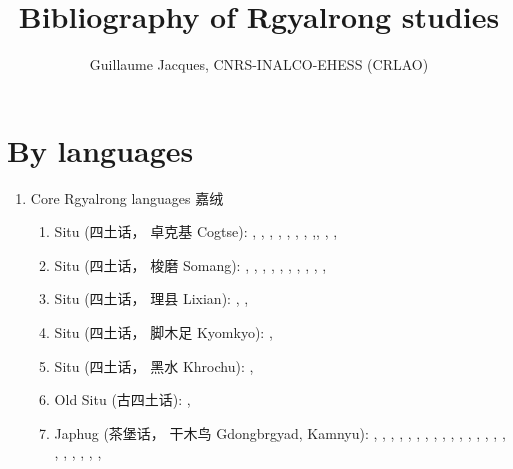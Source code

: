 \documentclass[oldfontcommands,oneside,a4paper,11pt]{article}
\newcommand{\zh}[1]{{\cn #1}}
\newcommand{\langue}[2]{#1}
\begin{document}
  \title{\langue{Bibliography of Rgyalrong studies}{Bibliographie des études rgyalrong}}
 
\author{Guillaume Jacques, CNRS-INALCO-EHESS (CRLAO)}
\maketitle
\sloppy
 
 
\section{\langue{By languages}{Publications classées par langue étudiée}}
\begin{enumerate}
\item \langue{Core Rgyalrong languages \zh{嘉绒}}{Rgyalrong \zh{嘉绒}}
\begin{enumerate}
\item Situ (\zh{四土话， 卓克基} Cogtse): \citet{nagano84}, \citet{linxr93jiarong}, \citet{lin02dimension}, \citet{huangsun02}, \citet{youjing03zhuokeji}, \citet{nagano03cogtse}, \citet{jacques03s.houzhui}, \citet{jacksonlin07},\citet{lin09phd}, \citet{lin11direction},  \citet{jacques12agreement},
\item Situ (\zh{四土话， 梭磨} Somang): \citet{jin57suomo}, \citet{jin58suomo}, \citet{bauman75}, \citet{delancey81ergativity},  \citet{delancey81direction}, \citet{qu83rencheng}, \citet{dai92suomo}, \citet{yanmuchu05houzhui}, \citet{yanmuchu05sa}, \citet{yanmuchu06hechengci}, 
\item Situ (\zh{四土话， 理县} Lixian): \citet{wolfenden36jyarung}, \citet{jin49jyarung}, \citet{chang68gyarung}
\item Situ (\zh{四土话， 脚木足} Kyomkyo): \citet{prins11kyomkyo},
\item Situ (\zh{四土话， 黑水} Khrochu): \citet{jackson15sastod},
\item \langue{Old Situ}{Ancien situ} (\zh{古四土话}): \citet{ngagdbang10gtamdpe},
\item Japhug (\zh{茶堡话， 干木鸟} Gdongbrgyad, Kamnyu):  \citet{jacques04redupl},     \citet{jacques04these},   \citet{jacques07passif},  \citet{jacques07redupl}, \citet{jacques08},  \citet{jacques10gesar}, \citet{jacques10refl},  \citet{jacques10inverse},  \citet{jacques12incorp},   \citet{jacques12demotion}, \citet{jacques11kinship}, \citet{jacques12agreement},  \citet{jacques13harmonization},  \citet{jacques13tropative}, \citet{jacques14antipassive}, \citet{japhug14ideophones}, \citet{jacques14inverse}, \citet{jacques14linking}, \citet{jacques14esquisse}, \citet{jacques15spontaneous}, \citet{jacques2012rgy}, \citet{jacques15causative}, 

\end{enumerate}
\end{enumerate}
\end{document}
